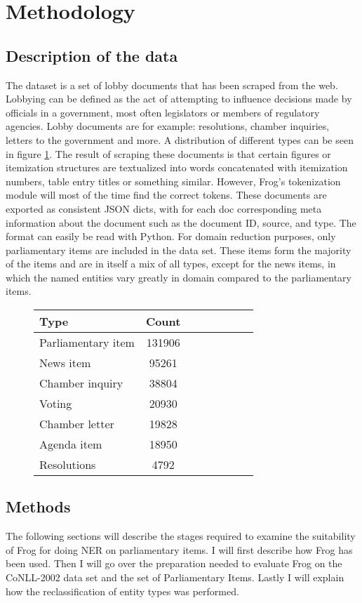 \section{Methodology}
\label{sec:meth}


\subsection{Description of the data}
The dataset is a set of lobby documents that has been scraped from the web. Lobbying can be defined as the act of attempting to influence decisions made by officials in a government, most often legislators or members of regulatory agencies. Lobby documents are for example: resolutions, chamber inquiries, letters to the government and more. A distribution of different types can be seen in figure \ref{fig:data_dis}. The result of scraping these documents is that certain figures or itemization structures are textualized into words concatenated with itemization numbers, table entry titles or something similar. However, Frog's tokenization module will most of the time find the correct tokens.  These documents are exported as consistent JSON dicts, with for each doc corresponding meta information about the document such as the document ID, source, and type. The format can easily be read with Python. For domain reduction purposes, only parliamentary items are included in the data set. These items form the majority of the items and are in itself a mix of all types, except for the news items, in which the named entities vary greatly in domain compared to the parliamentary items.

\begin{figure} \label{fig:data_dis}
\begin{tabular}{l*{6}{c}r}
Type              & Count \\
\hline
Parliamentary item & 131906  \\
News item & 95261 \\
Chamber inquiry & 38804  \\
Voting & 20930 \\
Chamber letter & 19828 \\
Agenda item & 18950  \\
Resolutions & 4792 \\
\end{tabular}
\end{figure}

\subsection{Methods}
The following sections will describe the stages required to examine the suitability of Frog for doing NER on parliamentary items. I will first describe how Frog has been used. Then I will go over the preparation needed to evaluate Frog on the CoNLL-2002 data set and the set of Parliamentary Items. Lastly I will explain how the reclassification of entity types was performed. 

